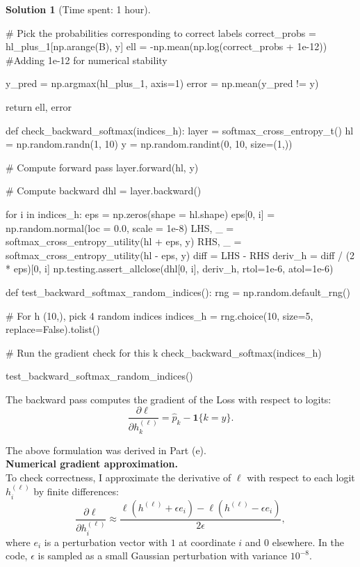 \documentclass[11pt, reqno, letterpaper, twoside]{amsart}
\theoremstyle{plain}
\theoremstyle{definition}
\newtheorem{solution}[theorem]{Solution}
\begin{document}
\begin{solution}[Time spent: 1 hour]
\begin{enumerate}
\begin{python}
    # Pick the probabilities corresponding to correct labels
    correct_probs = hl_plus_1[np.arange(B), y]
    ell = -np.mean(np.log(correct_probs + 1e-12)) #Adding 1e-12 for numerical stability

    y_pred = np.argmax(hl_plus_1, axis=1)
    error = np.mean(y_pred != y)

    return ell, error

def check_backward_softmax(indices_h):
    layer = softmax_cross_entropy_t()
    hl = np.random.randn(1, 10)
    y = np.random.randint(0, 10, size=(1,))

    # Compute forward pass
    layer.forward(hl, y)

    # Compute backward
    dhl = layer.backward()

    for i in indices_h:
        eps = np.zeros(shape = hl.shape)
        eps[0, i] = np.random.normal(loc = 0.0, scale = 1e-8)
        LHS, _ = softmax_cross_entropy_utility(hl + eps, y)
        RHS, _ = softmax_cross_entropy_utility(hl - eps, y)
        diff = LHS - RHS
        deriv_h = diff / (2 * eps)[0, i]
        np.testing.assert_allclose(dhl[0, i], deriv_h, rtol=1e-6, atol=1e-6)

def test_backward_softmax_random_indices():
    rng = np.random.default_rng()

    # For h (10,), pick 4 random indices
    indices_h = rng.choice(10, size=5, replace=False).tolist()

    # Run the gradient check for this k
    check_backward_softmax(indices_h)
    
test_backward_softmax_random_indices()
\end{python}

The backward pass computes the gradient of the Loss with respect to logits:
\[
\frac{\partial \ell}{\partial h^{(\ell)}_k}
= \hat p_k - \mathbf{1}\{k=y\}.
\]

The above formulation was derived in Part (e). \\

\textbf{Numerical gradient approximation.} \\
To check correctness, I approximate the derivative of $\ell$ with respect to each logit $h^{(\ell)}_i$ by finite differences:
\[
\frac{\partial \ell}{\partial h^{(\ell)}_i}
\approx \frac{\ell(h^{(\ell)}+\epsilon e_i) - \ell(h^{(\ell)}-\epsilon e_i)}{2\epsilon},
\]
where $e_i$ is a perturbation vector with $1$ at coordinate $i$ and $0$ elsewhere.  
In the code, $\epsilon$ is sampled as a small Gaussian perturbation with variance $10^{-8}$.


\end{enumerate}
\end{solution}
\end{document}
